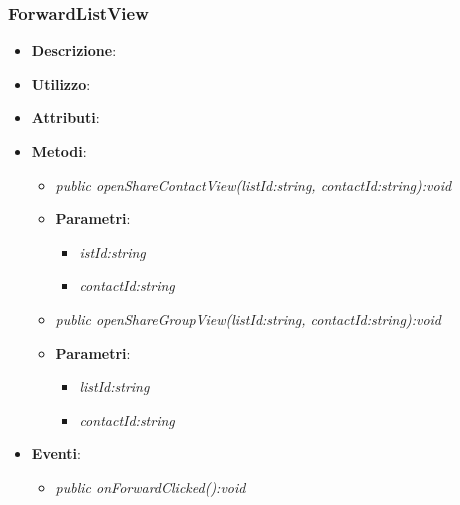 \subsubsection{ForwardListView}
\begin{itemize}
\item \textbf{Descrizione}: 
\item \textbf{Utilizzo}:
\item \textbf{Attributi}: 
\item \textbf{Metodi}:
\begin{itemize}
\item \textit{public openShareContactView(listId:string, contactId:string):void}\\

	\item{\textbf{Parametri}: \begin{itemize}
	\item \textit{istId:string}\\
	
	\item \textit{contactId:string}\\
	
	\end{itemize}}
	\item \textit{public openShareGroupView(listId:string, contactId:string):void}\\
	
		\item{\textbf{Parametri}: \begin{itemize}
		\item \textit{listId:string}\\
		
		\item \textit{contactId:string}\\
		
		\end{itemize}}
\end{itemize}
\item \textbf{Eventi}:
\begin{itemize}
\item \textit{public onForwardClicked():void}\\

\end{itemize}
\end{itemize}

